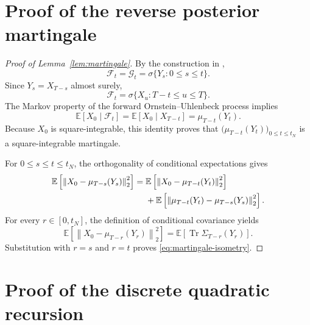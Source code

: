\documentclass[11pt]{article}
\theoremstyle{definition}
\newcommand{\E}{\mathbb{E}}
\newcommand{\norm}[1]{\left\lVert #1\right\rVert_2}
\newcommand{\Tr}{\operatorname{Tr}}
\begin{document}
\section{Proof of the reverse posterior martingale}
\label{app:martingale}

\begin{proof}[Proof of Lemma~\ref{lem:martingale}]
By the construction in ,
\[
    \mathcal F_t
    =
    \mathcal G_t
    =
    \sigma\{Y_s:0\le s\le t\}.
\]
Since $Y_s=X_{T-s}$ almost surely,
\[
    \mathcal F_t
    =
    \sigma\{X_u:T-t\le u\le T\}.
\]
The Markov property of the forward Ornstein--Uhlenbeck process implies
\[
    \E\left[X_0\mid\mathcal F_t\right]
    =
    \E\left[X_0\mid X_{T-t}\right]
    =
    \mu_{T-t}(Y_t).
\]
Because $X_0$ is square-integrable, this identity proves that
$\bigl(\mu_{T-t}(Y_t)\bigr)_{0\le t\le t_N}$ is a square-integrable
martingale.

For $0\le s\le t\le t_N$, the orthogonality of conditional
expectations gives
\begin{align}
    \E\left[\norm{X_0-\mu_{T-s}(Y_s)}^2\right]
    ={}&
    \E\left[\norm{X_0-\mu_{T-t}(Y_t)}^2\right]\notag\\
    &+
    \E\left[
        \norm{\mu_{T-t}(Y_t)-\mu_{T-s}(Y_s)}^2
    \right].\notag
\end{align}
For every $r\in[0,t_N]$, the definition of conditional covariance
yields
\[
    \E\left[\norm{X_0-\mu_{T-r}(Y_r)}^2\right]
    =
    \E\left[\Tr\Sigma_{T-r}(Y_r)\right].
\]
Substitution with $r=s$ and $r=t$ proves
\eqref{eq:martingale-isometry}.
\end{proof}

\section{Proof of the discrete quadratic recursion}
\label{app:discrete}
\end{document}
